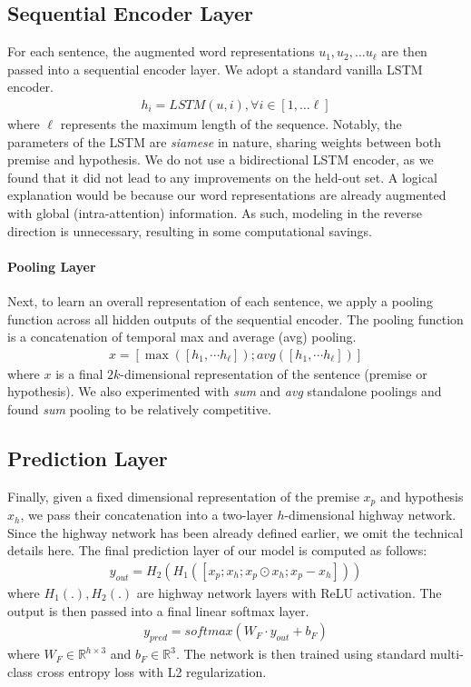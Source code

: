 \documentclass[11pt,a4paper]{article}
\begin{document}
\subsection{Sequential Encoder Layer}
For each sentence, the augmented word representations $u_1, u_2, \dots u_{\ell}$ are then passed into a sequential encoder layer. We adopt a standard vanilla LSTM encoder.
\begin{align}
h_i = LSTM(u, i), \forall i \in [1, \dots \ell]
\end{align}
where $\ell$ represents the maximum length of the sequence. Notably, the parameters of the LSTM are \textit{siamese} in nature, sharing weights between both premise and hypothesis. We do not use a bidirectional LSTM encoder, as we found that it did not lead to any improvements on the held-out set. A logical explanation would be because our word representations are already augmented with global (intra-attention) information. As such, modeling in the reverse direction is unnecessary, resulting in some computational savings.
\paragraph{Pooling Layer}
Next, to learn an overall representation of each sentence, we apply a pooling function across all hidden outputs of the sequential encoder. The pooling function is a concatenation of temporal max and average (avg) pooling.
\begin{align}
x = [\max([h_1, \cdots h_\ell]); avg([h_1, \cdots h_\ell])]
\end{align}
where $x$ is a final $2k$-dimensional representation of the sentence (premise or hypothesis). We also experimented with \textit{sum} and \textit{avg} standalone poolings and found \textit{sum} pooling to be relatively competitive.
\subsection{Prediction Layer}
Finally, given a fixed dimensional representation of the premise $x_p$ and hypothesis $x_h$, we pass their concatenation into a two-layer $h$-dimensional highway network. Since the highway network has been already defined earlier, we omit the technical details here. The final prediction layer of our model is computed as follows:
\begin{align}
y_{out} = H_{2}(H_{1}([x_{p}; x_{h}; x_p \odot x_h; x_p - x_h]))
\end{align}
where $H_{1}(.), H_{2}(.)$ are highway network layers with ReLU activation. The output is then passed into a final linear softmax layer.
\begin{align}
y_{pred} = softmax(W_{F} \cdot y_{out} + b_{F})
\end{align}
where $W_{F} \in \mathbb{R}^{h \times 3}$ and $b_{F} \in \mathbb{R}^{3}$. The network is then trained using standard multi-class cross entropy loss with L2 regularization.
\end{document}
